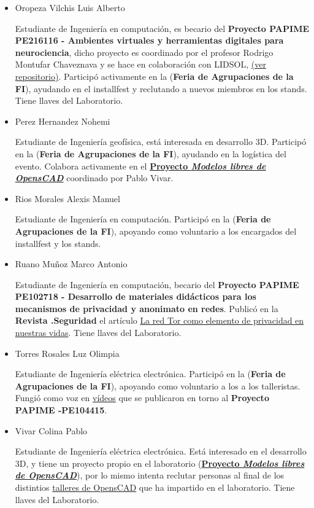 \documentclass[a4paper,11pt]{article}                 %
\begin{document}
\begin{itemize}
    \item Oropeza Vilchis Luis Alberto
    
    Estudiante de Ingeniería en computación, es becario del \textbf{Proyecto PAPIME PE216116 - Ambientes virtuales y herramientas digitales para neurociencia}, dicho proyecto es coordinado por el profesor Rodrigo Montufar Chaveznava y se hace en colaboración con LIDSOL, \href{https://github.com/LIDSOL/portia}{(ver repositorio)}. Participó activamente en la (\textbf{Feria de Agrupaciones de la FI}), ayudando en el installfest y reclutando a nuevos miembros en los stands. Tiene llaves del Laboratorio.
    
    \item Perez Hernandez Nohemi
    
    Estudiante de Ingeniería geofísica, está interesada en desarrollo 3D. Participó en la (\textbf{Feria de Agrupaciones de la FI}), ayudando en la logística del evento. Colabora activamente en el \href{https://github.com/LIDSOL/OpenSCAD-free-models}{\textbf{Proyecto \textit{Modelos libres de OpensCAD}}} coordinado por Pablo Vivar.
    
    \item Rios Morales Alexis Manuel
    
    Estudiante de Ingeniería en computación. Participó en la (\textbf{Feria de Agrupaciones de la FI}), apoyando como voluntario a los encargados del installfest y  los stands.
     
    \item Ruano Muñoz Marco Antonio
    
    Estudiante de Ingeniería en computación, becario del \textbf{Proyecto PAPIME PE102718 - Desarrollo de materiales didácticos para los mecanismos de privacidad y anonimato en redes}. Publicó en la \textbf{Revista .Seguridad} el artículo \href{https://revista.seguridad.unam.mx/numero30/la-red-tor-como-elemento-de-privacidad-en-nuestras-vidas}{La red Tor como elemento de privacidad en nuestras vidas}. Tiene llaves del Laboratorio.
    
    \item Torres Rosales Luz Olimpia
    
    Estudiante de Ingeniería eléctrica electrónica. Participó en la (\textbf{Feria de Agrupaciones de la FI}), apoyando como voluntario a los a los talleristas. Fungió como voz en \href{https://www.youtube.com/channel/UCwHFqMqxUcCAJSdek3e4zOw}{vídeos} que se publicaron en torno al  \textbf{Proyecto PAPIME -PE104415}.
    
    \item Vivar Colina Pablo
    
    Estudiante de Ingeniería eléctrica electrónica. Está interesado en el desarrollo 3D, y tiene un proyecto propio en el laboratorio (\href{https://github.com/LIDSOL/OpenSCAD-free-models}{\textbf{Proyecto \textit{Modelos libres de OpensCAD}}}), por lo mismo intenta reclutar personas al final de los distintios \href{https://github.com/LIDSOL/OpenSCAD-curso}{talleres de OpensCAD} que ha impartido en el laboratorio. Tiene llaves del Laboratorio.
  \end{itemize}
  
\end{document}
